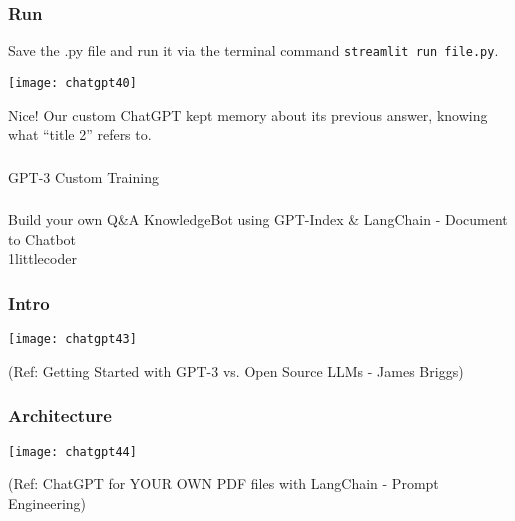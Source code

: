 \begin{frame}[fragile]\frametitle{ Run}
 Save the .py file and run it via the terminal command \lstinline|streamlit run file.py|.

\begin{center}
\texttt{[image: chatgpt40]}
\end{center}

Nice! Our custom ChatGPT kept memory about its previous answer, knowing what “title 2” refers to.

\end{frame}

\begin{frame}[fragile]\frametitle{}
\begin{center}
{\Large GPT-3 Custom Training}
\end{center}
\end{frame}

\begin{frame}[fragile]\frametitle{}
\begin{center}
{\Large Build your own Q\&A KnowledgeBot using GPT-Index \& LangChain - Document to Chatbot\\ 1littlecoder}
\end{center}
\end{frame}

\begin{frame}[fragile]\frametitle{Intro}

\begin{center}
\texttt{[image: chatgpt43]}

{\tiny (Ref: Getting Started with GPT-3 vs. Open Source LLMs - James Briggs)}

\end{center}		


\end{frame}

\begin{frame}[fragile]\frametitle{ Architecture}

\begin{center}
\texttt{[image: chatgpt44]}

{\tiny (Ref: ChatGPT for YOUR OWN PDF files with LangChain - Prompt Engineering)}

\end{center}

\end{frame}


